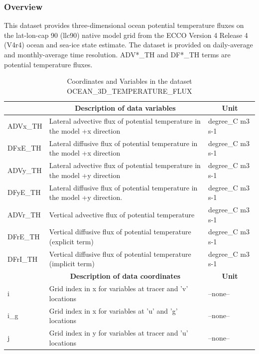 \subsubsection{Overview}
This dataset provides three-dimensional ocean potential temperature fluxes on the lat-lon-cap 90 (llc90) native model grid from the ECCO Version 4 Release 4 (V4r4) ocean and sea-ice state estimate. The dataset is provided on daily-average and monthly-average time resolution. ADV*\_TH and DF*\_TH terms are potential temperature fluxes. 
\begin{longtable}{|m{}|m{}|m{}|}
\caption{Coordinates and Variables in the dataset OCEAN\_3D\_TEMPERATURE\_FLUX}
\label{tab:table-OCEAN_3D_TEMPERATURE_FLUX-fields} \\ 
\hline \endhead \hline \endfoot
\rowcolor{lightgray} \multicolumn{1}{|c|}{\textbf{Variables}} & \multicolumn{1}{|c|}{\textbf{Description of data variables}} &  \multicolumn{1}{|c|}{\textbf{Unit}}\\ \hline
ADVx\_TH &Lateral advective flux of potential temperature in the model +x direction &degree\_C m3 s-1  \\ \hline
DFxE\_TH &Lateral diffusive flux of potential temperature in the model +x direction &degree\_C m3 s-1  \\ \hline
ADVy\_TH &Lateral advective flux of potential temperature in the model +y direction &degree\_C m3 s-1  \\ \hline
DFyE\_TH &Lateral diffusive flux of potential temperature in the model +y direction. &degree\_C m3 s-1  \\ \hline
ADVr\_TH &Vertical advective flux of potential temperature &degree\_C m3 s-1  \\ \hline
DFrE\_TH &Vertical diffusive flux of potential temperature (explicit term) &degree\_C m3 s-1  \\ \hline
DFrI\_TH &Vertical diffusive flux of potential temperature (implicit term) &degree\_C m3 s-1  \\ \hline
\rowcolor{lightgray} \multicolumn{1}{|c|}{\textbf{Coordinates}} & \multicolumn{1}{|c|}{\textbf{Description of data coordinates}} &  \multicolumn{1}{|c|}{\textbf{Unit}}\\ \hline
i &Grid index in x for variables at tracer and 'v' locations &--none--  \\ \hline
i\_g &Grid index in x for variables at 'u' and 'g' locations &--none--  \\ \hline
j &Grid index in y for variables at tracer and 'u' locations &--none--  \\ \hline

\end{longtable}
